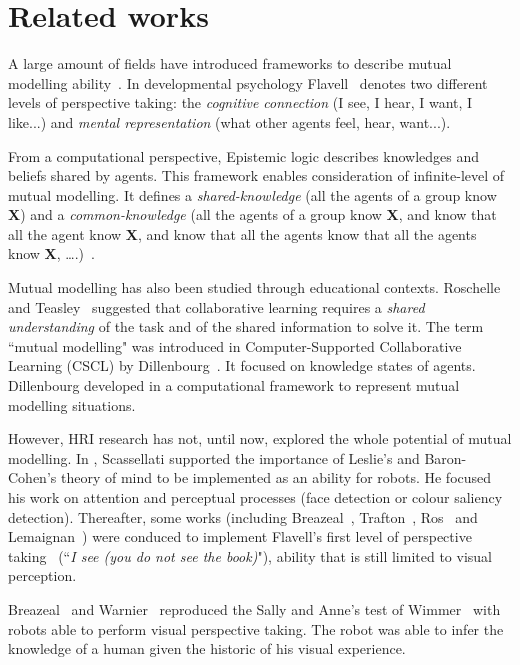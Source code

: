 \documentclass[conference]{IEEEtran}
\begin{document}
\section{Related works}

A large amount of fields have introduced frameworks to describe mutual modelling ability~\cite{lemaignan2015mutual}. 
In developmental psychology Flavell~\cite{flavell1990developmental} denotes two different levels of perspective taking: the \textit{cognitive connection} (I see, I hear, I want, I like...) and \textit{mental representation} (what other agents feel, hear, want...).

From a computational perspective, Epistemic logic describes knowledges and beliefs shared by agents. This framework enables consideration of infinite-level of mutual modelling. It defines a \textit{shared-knowledge} (all the agents of a group know \textbf{X}) and a \textit{common-knowledge} (all the agents of a group know \textbf{X}, and know that all the agent know \textbf{X}, and know that all the agents know that all the agents know \textbf{X}, \dots.)~\cite{hendricks2008epistemic}. 

Mutual modelling has also been studied through educational contexts. Roschelle and Teasley~\cite{roschelle1995construction} suggested that collaborative learning requires a \textit{shared understanding} of the task and of the shared information to solve it. 
The term ``mutual modelling" was introduced in Computer-Supported Collaborative Learning (CSCL) by Dillenbourg~\cite{dillenbourg1999you}. It focused on knowledge states of agents. Dillenbourg developed in \cite{sangin2007partner} a computational framework to represent mutual modelling situations.

However, HRI research has not, until now, explored the whole potential of mutual modelling. In \cite{scassellati2002theory}, Scassellati supported the importance of Leslie's and Baron-Cohen's theory of mind to be implemented as an ability for robots. 
He focused his work on attention and perceptual processes (face detection or colour saliency detection). Thereafter, some works (including Breazeal~\cite{breazeal2006using}, Trafton~\cite{Trafton2005}, Ros~\cite{Ros2010} and Lemaignan~\cite{lemaignan2012thesis}) were conduced to implement Flavell's first level of perspective taking~\cite{flavell1977development} (``\textit{I see (you do not see the book)}"), ability that is still limited to visual perception. 

Breazeal~\cite{breazeal2009embodied} and Warnier~\cite{warnier2012when} reproduced the Sally and Anne's test of Wimmer~\cite{wimmer1983beliefs} with robots able to perform visual perspective taking. The robot was able to infer the knowledge of a human given the historic of his visual experience. 
\end{document}
